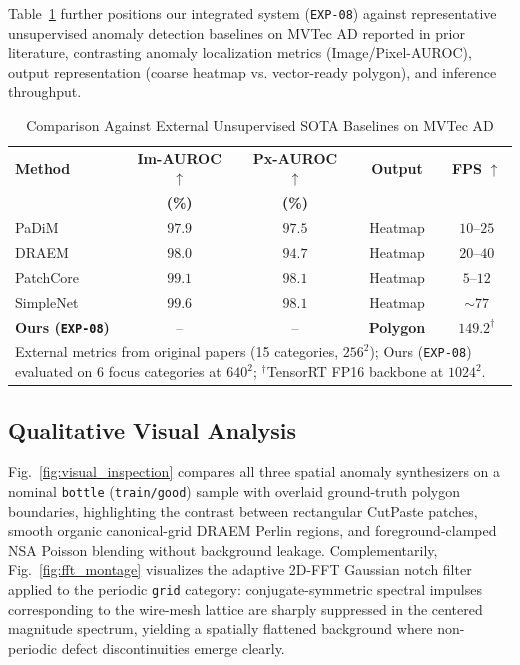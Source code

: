 Table~\ref{tab:sota_comparison} further positions our integrated system (\texttt{EXP-08}) against representative unsupervised anomaly detection baselines on MVTec AD reported in prior literature, contrasting anomaly localization metrics (Image/Pixel-AUROC), output representation (coarse heatmap vs. vector-ready polygon), and inference throughput.

\begin{table}[t]
\centering
\caption{Comparison Against External Unsupervised SOTA Baselines on MVTec AD}
\label{tab:sota_comparison}
\setlength{\tabcolsep}{3.5pt}
\begin{tabular}{l c c c c}
\toprule
\textbf{Method} & \textbf{Im-AUROC} $\uparrow$ & \textbf{Px-AUROC} $\uparrow$ & \textbf{Output} & \textbf{FPS} $\uparrow$ \\
 & \textbf{(\%)} & \textbf{(\%)} & & \\
\midrule
PaDiM \cite{defard2021padim} & $97.9$ & $97.5$ & Heatmap & $10$--$25$ \\
DRAEM \cite{zavrtanik2021draem} & $98.0$ & $94.7$ & Heatmap & $20$--$40$ \\
PatchCore \cite{roth2022towards} & $99.1$ & $98.1$ & Heatmap & $5$--$12$ \\
SimpleNet \cite{liu2023simplenet} & $99.6$ & $98.1$ & Heatmap & $\sim 77$ \\
\midrule
\textbf{Ours (\texttt{EXP-08})} & -- & -- & \textbf{Polygon} & $\mathbf{149.2}^\dagger$ \\
\bottomrule
\multicolumn{5}{p{0.94\columnwidth}}{\footnotesize External metrics from original papers (15 categories, $256^2$); Ours (\texttt{EXP-08}) evaluated on 6 focus categories at $640^2$; $^\dagger$TensorRT FP16 backbone at $1024^2$.}
\end{tabular}
\end{table}

\subsection{Qualitative Visual Analysis}
Fig.~\ref{fig:visual_inspection} compares all three spatial anomaly synthesizers on a nominal \texttt{bottle} (\texttt{train/good}) sample with overlaid ground-truth polygon boundaries, highlighting the contrast between rectangular CutPaste patches, smooth organic canonical-grid DRAEM Perlin regions, and foreground-clamped NSA Poisson blending without background leakage. Complementarily, Fig.~\ref{fig:fft_montage} visualizes the adaptive 2D-FFT Gaussian notch filter applied to the periodic \texttt{grid} category: conjugate-symmetric spectral impulses corresponding to the wire-mesh lattice are sharply suppressed in the centered magnitude spectrum, yielding a spatially flattened background where non-periodic defect discontinuities emerge clearly.

